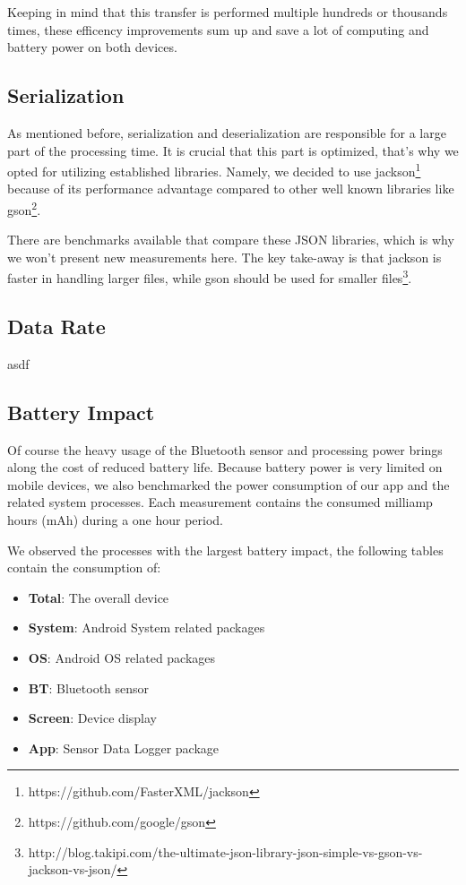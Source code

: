 Keeping in mind that this transfer is performed multiple hundreds or thousands times, these efficency improvements sum up and save a lot of computing and battery power on both devices.

\subsection{Serialization}
As mentioned before, serialization and deserialization are responsible for a large part of the processing time.
It is crucial that this part is optimized, that's why we opted for utilizing established libraries.
Namely, we decided to use jackson\footnote{https://github.com/FasterXML/jackson} because of its performance advantage compared to other well known libraries like gson\footnote{https://github.com/google/gson}.

There are benchmarks available that compare these JSON libraries, which is why we won't present new measurements here.
The key take-away is that jackson is faster in handling larger files, while gson should be used for smaller files\footnote{http://blog.takipi.com/the-ultimate-json-library-json-simple-vs-gson-vs-jackson-vs-json/}.

\subsection{Data Rate}
asdf

\subsection{Battery Impact}
Of course the heavy usage of the Bluetooth sensor and processing power brings along the cost of reduced battery life.
Because battery power is very limited on mobile devices, we also benchmarked the power consumption of our app and the related system processes.
Each measurement contains the consumed milliamp hours (mAh) during a one hour period.

We observed the processes with the largest battery impact, the following tables contain the consumption of:

\begin{itemize}[noitemsep]
    \item \textbf{Total}: The overall device
    \item \textbf{System}: Android System related packages
    \item \textbf{OS}: Android OS related packages
    \item \textbf{BT}: Bluetooth sensor
    \item \textbf{Screen}: Device display
    \item \textbf{App}: Sensor Data Logger package
\end{itemize}

